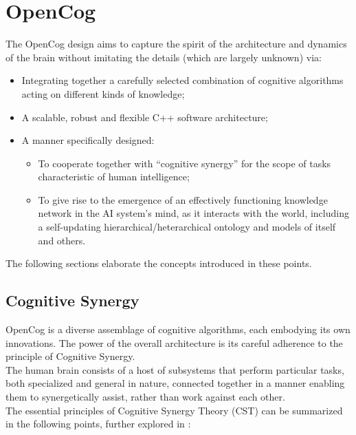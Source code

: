 \chapter{OpenCog} \label{cha:opencog_system}

The OpenCog design aims to capture the spirit of the architecture and dynamics of the brain without imitating the details (which are largely unknown) via:
\begin{itemize}
	\item Integrating together a carefully selected combination of cognitive algorithms acting on different kinds of knowledge;
	\item A scalable, robust and flexible C++ software architecture;
	\item A manner specifically designed:
	\begin{itemize}	
	\item To cooperate together with “cognitive synergy” for the scope of tasks characteristic of human intelligence;
	\item To give rise to the emergence of an effectively functioning knowledge network in the AI system’s mind, as it interacts with the world, including a self-updating hierarchical/heterarchical ontology and models of itself and others.
	\end{itemize}
\end{itemize}

The following sections elaborate the concepts introduced in these points.


\section{Cognitive Synergy}\label{sec:cognitive_synergy}  %

OpenCog is a diverse assemblage of cognitive algorithms, each embodying its own innovations. The power of the overall architecture is its careful adherence to the principle of Cognitive Synergy. \\
The human brain consists of a host of subsystems that perform particular tasks, both specialized and general in nature, connected together in a manner enabling them to synergetically assist, rather than work against each other. \\
The essential principles of Cognitive Synergy Theory (CST) can be summarized in the following points, further explored in \cite{inproceedings_cognitive_synergy}:


